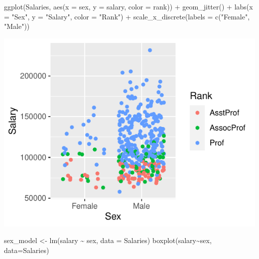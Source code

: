 \documentclass[
]{article}
\newenvironment{Shaded}{\begin{snugshade}}{\end{snugshade}}
\newcommand{\AttributeTok}[1]{\textcolor[rgb]{0.77,0.63,0.00}{#1}}
\newcommand{\FunctionTok}[1]{\textcolor[rgb]{0.00,0.00,0.00}{#1}}
\newcommand{\NormalTok}[1]{#1}
\newcommand{\OtherTok}[1]{\textcolor[rgb]{0.56,0.35,0.01}{#1}}
\newcommand{\SpecialCharTok}[1]{\textcolor[rgb]{0.00,0.00,0.00}{#1}}
\newcommand{\StringTok}[1]{\textcolor[rgb]{0.31,0.60,0.02}{#1}}
\begin{document}
\begin{Shaded}
\begin{Highlighting}[]
\FunctionTok{ggplot}\NormalTok{(Salaries, }\FunctionTok{aes}\NormalTok{(}\AttributeTok{x =}\NormalTok{ sex, }\AttributeTok{y =}\NormalTok{ salary, }\AttributeTok{color =}\NormalTok{ rank)) }\SpecialCharTok{+}
  \FunctionTok{geom\_jitter}\NormalTok{() }\SpecialCharTok{+}
  \FunctionTok{labs}\NormalTok{(}\AttributeTok{x =} \StringTok{"Sex"}\NormalTok{, }\AttributeTok{y =} \StringTok{"Salary"}\NormalTok{, }\AttributeTok{color =} \StringTok{"Rank"}\NormalTok{) }\SpecialCharTok{+}
  \FunctionTok{scale\_x\_discrete}\NormalTok{(}\AttributeTok{labels =} \FunctionTok{c}\NormalTok{(}\StringTok{"Female"}\NormalTok{, }\StringTok{"Male"}\NormalTok{))}
\end{Highlighting}
\end{Shaded}

\begin{center}\includegraphics{compulsory_files/figure-latex/sex_model_with_rank-1} \end{center}

\begin{Shaded}
\begin{Highlighting}[]
\NormalTok{sex\_model }\OtherTok{\textless{}{-}} \FunctionTok{lm}\NormalTok{(salary }\SpecialCharTok{\textasciitilde{}}\NormalTok{ sex, }\AttributeTok{data =}\NormalTok{ Salaries)}
\FunctionTok{boxplot}\NormalTok{(salary}\SpecialCharTok{\textasciitilde{}}\NormalTok{sex, }\AttributeTok{data=}\NormalTok{Salaries)}
\end{Highlighting}
\end{Shaded}
\end{document}
